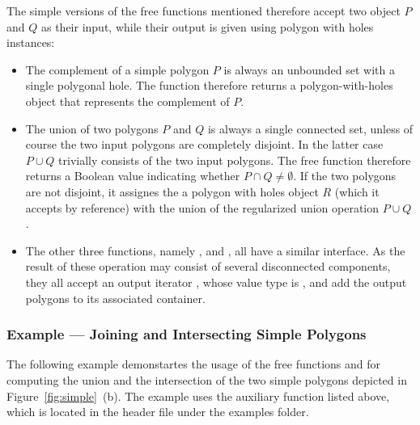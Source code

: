 The simple versions of the free functions mentioned therefore
accept two  object $P$ and $Q$ as their input, while
their output is given using polygon with holes instances:
\begin{itemize}
\item The complement of a simple polygon $P$ is always an unbounded set
with a single polygonal hole. The function  therefore
returns a polygon-with-holes object that represents the complement of $P$.
\item The union of two polygons $P$ and $Q$ is always a single connected
set, unless of course the two input polygons are completely disjoint. In
the latter case $P \cup Q$ trivially consists of the two input polygons.
The free function  therefore returns a Boolean value
indicating whether $P \cap Q \neq \emptyset$. If the two polygons are not
disjoint, it assignes the a polygon with holes object $R$ (which it
accepts by reference) with the union of the regularized union operation
$P \cup Q$.
\item The other three functions, namely , 
 and , all
have a similar interface. As the result of these operation may consist
of several disconnected components, they all accept an output iterator
, whose value type is , and add the
output polygons to its associated container.
\end{itemize}

\subsubsection{Example --- Joining and Intersecting Simple Polygons\label{bso_sssec:ex_simple_bops}}

The following example demonstartes the usage of the free functions
 and  for computing the union and the
intersection of the two simple polygons depicted in
Figure~\ref{fig:simple}~(b). The example uses the auxiliary function
 listed above, which is located in
the header file  under the examples folder.


